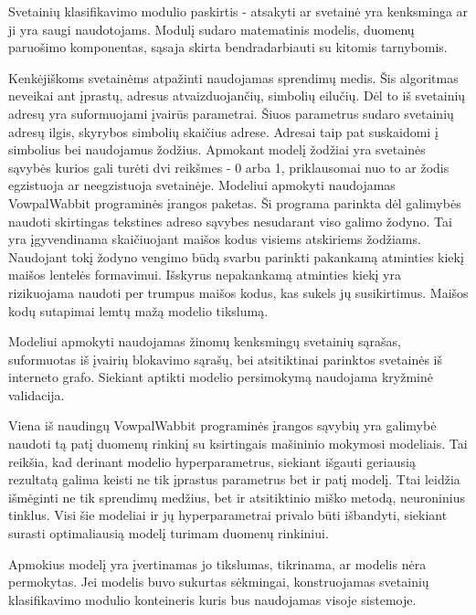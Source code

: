 Svetainių klasifikavimo modulio paskirtis - atsakyti ar svetainė yra kenksminga ar ji yra saugi naudotojams.
Modulį sudaro matematinis modelis, duomenų paruošimo komponentas, sąsaja skirta bendradarbiauti su kitomis tarnybomis.

Kenkėjiškoms svetainėms atpažinti naudojamas sprendimų medis. Šis algoritmas neveikai ant įprastų, adresus
atvaizduojančių, simbolių eilučių. Dėl to iš svetainių adresų yra suformuojami įvairūs parametrai. Šiuos parametrus
sudaro svetainių adresų ilgis, skyrybos simbolių skaičius adrese. Adresai taip pat suskaidomi į simbolius bei naudojamus
žodžius. Apmokant modelį žodžiai yra svetainės sąvybės kurios gali turėti dvi reikšmes - 0 arba 1, priklausomai nuo to
ar žodis egzistuoja ar neegzistuoja svetainėje. Modeliui apmokyti naudojamas VowpalWabbit programinės įrangos paketas.
Ši programa parinkta dėl galimybės naudoti skirtingas tekstines adreso sąvybes nesudarant viso galimo žodyno. Tai yra
įgyvendinama skaičiuojant maišos kodus visiems atskiriems žodžiams. Naudojant tokį žodyno vengimo būdą svarbu parinkti
pakankamą atminties kiekį maišos lentelės formavimui. Išskyrus nepakankamą atminties kiekį yra rizikuojama naudoti per
trumpus maišos kodus, kas sukels jų susikirtimus. Maišos kodų sutapimai lemtų mažą modelio tikslumą.

Modeliui apmokyti naudojamas žinomų kenksmingų svetainių sąrašas, suformuotas iš įvairių blokavimo sąrašų, bei
atsitiktinai parinktos svetainės iš interneto grafo. Siekiant aptikti modelio persimokymą naudojama kryžminė
validacija.

Viena iš naudingų VowpalWabbit programinės įrangos sąvybių yra galimybė naudoti tą patį duomenų rinkinį su ksirtingais
mašininio mokymosi modeliais. Tai reikšia, kad derinant modelio hyperparametrus, siekiant išgauti geriausią rezultatą
galima keisti ne tik įprastus parametrus bet ir patį modelį. Ttai leidžia išmėginti ne tik sprendimų medžius, bet ir
atsitiktinio miško metodą, neuroninius tinklus. Visi šie modeliai ir jų hyperparametrai privalo būti išbandyti,
siekiant surasti optimaliausią modelį turimam duomenų rinkiniui.

Apmokius modelį yra įvertinamas jo tikslumas, tikrinama, ar modelis nėra permokytas. Jei modelis buvo sukurtas sėkmingai,
konstruojamas svetainių klasifikavimo modulio konteineris kuris bus naudojamas visoje sistemoje.


